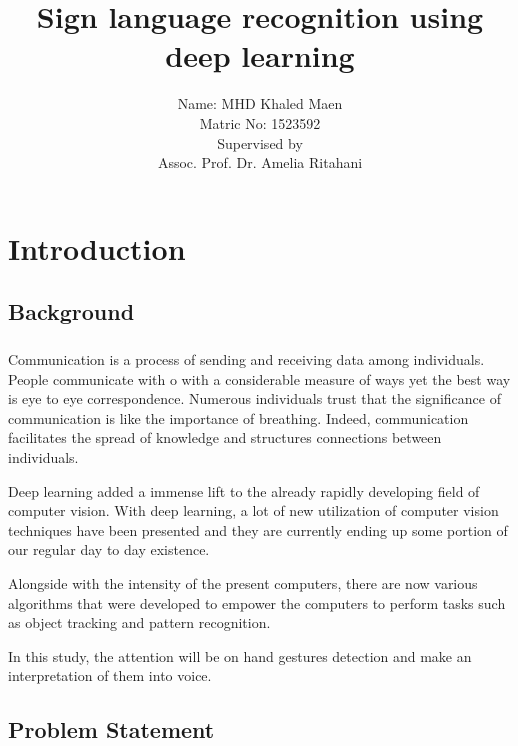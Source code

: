 \documentclass[12pt]{report}
\title{Sign language recognition using deep learning}
\author{ Name: MHD Khaled Maen\\
        Matric No: 1523592 \\ 
        [1.5cm]
        Supervised by\\
        Assoc. Prof. Dr. Amelia Ritahani \\}
\begin{document}
    \maketitle
    \setcounter{page}{2}                    
    \tableofcontents
    \newpage
    \chapter{Introduction} 
        \section{Background}
            \paragraph{}
                Communication is a process of sending and receiving data among individuals. 
                People communicate with o with a considerable measure of ways yet the best way is eye to eye correspondence.
                Numerous individuals trust that the significance of communication 
                is like the importance of breathing. Indeed, communication facilitates the spread of knowledge
                and structures connections between individuals.
            
                Deep learning added a immense lift to the already rapidly developing field of computer vision.
                With deep learning, a lot of new utilization of computer vision techniques have been presented
                and they are currently ending up some portion of our regular day to day existence.
            
                Alongside  with  the intensity of the present computers, there are now various algorithms that were developed 
                to empower the computers to perform tasks such as object tracking and pattern recognition. 
                
                In this study, the attention will be on hand gestures detection and make an interpretation of them into voice.

        \section{Problem Statement}
\end{document}
